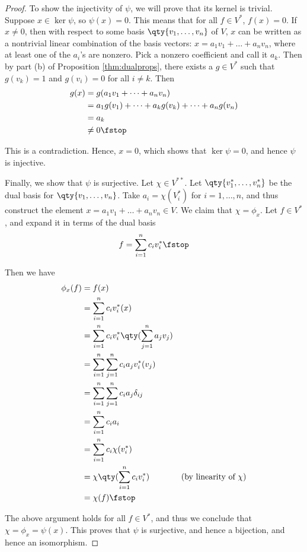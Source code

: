 \begin{proof}
  To show the injectivity of \( \psi \), we will prove that its kernel is trivial. Suppose \( x\in\ker\psi \), so \( \psi(x)=0 \). This means that for all \( f\in V^* \), \( f(x)=0 \). If \( x\neq 0 \), then with respect to some basis \( \qty{v_1,\dots,v_n} \) of \( V \), \( x \) can be written as a nontrivial linear combination of the basis vectors: \( x=a_1v_1+\dots+a_nv_n \), where at least one of the \( a_i \)'s are nonzero. Pick a nonzero coefficient and call it \( a_k \). Then by part (b) of Proposition \ref{thm:dualprops}, there exists a \( g\in V^* \) such that \( g(v_k)=1 \) and \( g(v_i)=0 \) for all \( i\neq k \). Then
  \begin{align*}
    g(x)&=g(a_1v_1+\dots+a_nv_n)\\
        &= a_1g(v_1)+\dots+a_kg(v_k)+\dots+a_ng(v_n)\\
        &= a_k\\
        &\neq 0\fstop
  \end{align*}
  
  This is a contradiction. Hence, \( x=0 \), which shows that \( \ker\psi=\qty{0} \), and hence \( \psi \) is injective.

  \vspace{3mm}

  Finally, we show that \( \psi \) is surjective. Let \( \chi\in V^{**} \). Let \( \qty{v^*_1,\dots,v^*_n} \) be the dual basis for \( \qty{v_1,\dots,v_n} \). Take \( a_i=\chi(V^*_i) \) for \( i=1,\dots,n \), and thus construct the element \( x=a_1v_1+\dots+a_nv_n\in V \). We claim that \( \chi=\phi_x \). Let \( f\in V^* \), and expand it in terms of the dual basis
  \[ f=\sum_{i=1}^nc_iv^*_i\fstop \]

  Then we have
  \begin{align*}
    \phi_x(f)&= f(x)\\
    &= \sum_{i=1}^nc_iv^*_i(x)\\
    &= \sum_{i=1}^nc_iv^*_i\qty(\sum_{j=1}^na_jv_j)\\
    &= \sum_{i=1}^n\sum_{j=1}^nc_ia_jv^*_i(v_j)\\
    &= \sum_{i=1}^n\sum_{j=1}^nc_ia_j\delta_{ij}\\
    &= \sum_{i=1}^nc_ia_i\\
    &= \sum_{i=1}^n c_i\chi(v^*_i)\\
    &= \chi\qty(\sum_{i=1}^nc_iv^*_i) &(\text{by linearity of }\chi)\\
    &= \chi(f)\fstop
  \end{align*}

  The above argument holds for all \( f\in V^* \), and thus we conclude that \( \chi=\phi_x=\psi(x) \). This proves that \( \psi \) is surjective, and hence a bijection, and hence an isomorphism.
\end{proof}

